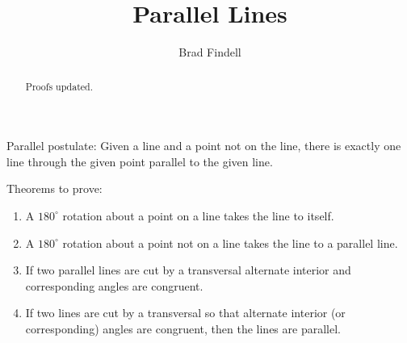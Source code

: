 \documentclass[nooutcomes]{ximera}
\title{Parallel Lines}
\author{Brad Findell}
\begin{document}
\begin{abstract}
Proofs updated. 
\end{abstract}
\maketitle

Parallel postulate:  Given a line and a point not on the line, there is exactly one line through the given point parallel to the given line.  

Theorems to prove: 
\begin{enumerate}
\item A $180^\circ$ rotation about a point on a line takes the line to itself. 
\item A $180^\circ$ rotation about a point not on a line takes the line to a parallel line.
\item If two parallel lines are cut by a transversal alternate interior and corresponding angles are congruent.
\item If two lines are cut by a transversal so that alternate interior (or  corresponding) angles are congruent, then the lines are parallel. 
\end{enumerate}


\end{document}

